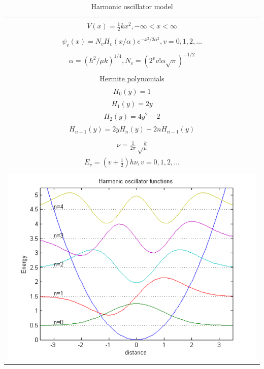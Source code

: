 \documentclass[11pt]{article}
\begin{document}
\begin{table}[tbh]
   \begin{center}
   \caption{Harmonic oscillator model}
    \label{Harmonic-oscillator}
\begin{tabular}[h]{|c|}
\hline
 \\
$\displaystyle       V(x) = \frac{1}{2} k x^2, -\infty < x < \infty $ \\
 \\
$\displaystyle     \psi_v(x) = N_v H_v(x/\alpha)e^{-x^2/2\alpha^2}, v = 0, 1, 2, \ldots $ \\
\\
$\displaystyle \alpha=(\hbar^2/\mu k)^{1/4}, N_v=(2^vv!\alpha\sqrt{\pi})^{-1/2} $ \\
 \\
\underline{Hermite polynomials} \\
$\displaystyle H_0(y) =1$\\
$\displaystyle H_1(y) = 2y$\\
$\displaystyle H_2(y) = 4y^2-2$\\
$\displaystyle H_{n+1}(y) = 2 y H_n(y) -2 n H_{n-1}(y)$\\
 \\
$\displaystyle     \nu =\frac{1}{2\pi}\sqrt\frac{k}{\mu}$ \\
$\displaystyle     E_v=(v+\frac{1}{2})h \nu, v=0, 1, 2, ...$ \\
 \\
     \includegraphics[scale=.6]{Images/HO} \\       
\hline
\end{tabular}
 \end{center}
\end{table}
\end{document}
